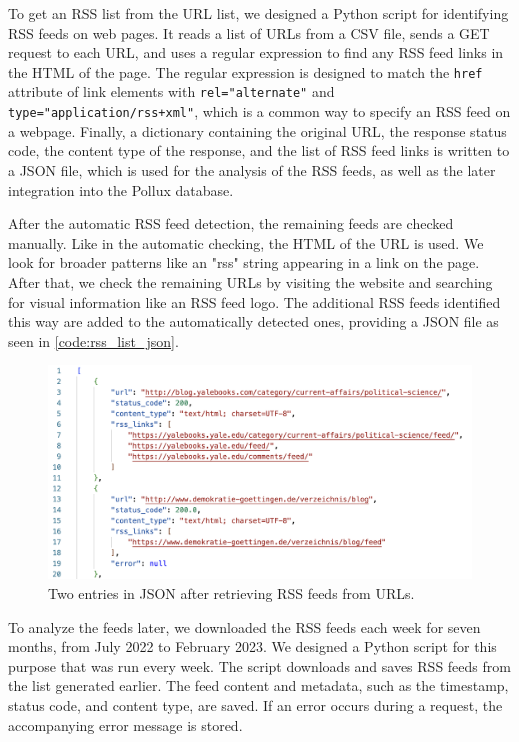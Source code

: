 \documentclass{article}
\begin{document}
To get an RSS list from the URL list, we designed a Python script for identifying RSS feeds on web pages. It reads a list of URLs from a CSV file, sends a GET request to each URL, and uses a regular expression to find any RSS feed links in the HTML of the page. The regular expression is designed to match the \texttt{href} attribute of link elements with \texttt{rel="alternate"} and \texttt{type="application/rss+xml"}, which is a common way to specify an RSS feed on a webpage. Finally, a dictionary containing the original URL, the response status code, the content type of the response, and the list of RSS feed links is written to a JSON file, which is used for the analysis of the RSS feeds, as well as the later integration into the Pollux database.

After the automatic RSS feed detection, the remaining feeds are checked manually. Like in the automatic checking, the HTML of the URL is used. We look for broader patterns like an "rss" string appearing in a link on the page. After that, we check the remaining URLs by visiting the website and searching for visual information like an RSS feed logo. The additional RSS feeds identified this way are added to the automatically detected ones, providing a JSON file as seen in \autoref{code:rss_list_json}.
\begin{figure}[htb]
    \includegraphics[width=.7\textwidth]{figures/rss_list_json.png}
    \caption{Two entries in JSON after retrieving RSS feeds from URLs.}
    \label{code:rss_list_json}
\end{figure}

To analyze the feeds later, we downloaded the RSS feeds each week for seven months, from July 2022 to February 2023. We designed a Python script for this purpose that was run every week. The script downloads and saves RSS feeds from the list generated earlier. The feed content and metadata, such as the timestamp, status code, and content type, are saved. If an error occurs during a request, the accompanying error message is stored.
\end{document}
